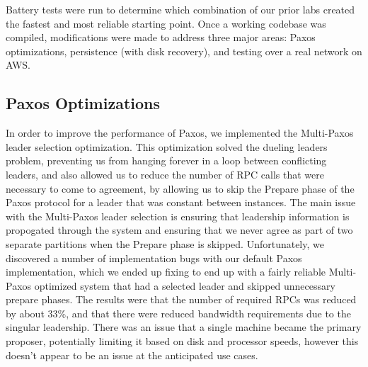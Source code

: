 \documentclass[letterpaper,10pt]{article}
\begin{document}
Battery tests were run to determine which combination of our prior labs created the fastest and most reliable starting point.  Once a working codebase was compiled, modifications were made to address three  major areas: Paxos optimizations, persistence (with disk recovery), and testing over a real network on AWS.

\subsection{Paxos Optimizations}
In order to improve the performance of Paxos, we implemented the Multi-Paxos leader selection optimization. This optimization solved the dueling leaders problem, preventing us from hanging forever in a loop between conflicting leaders, and also allowed us to reduce the number of RPC calls that were necessary to come to agreement, by allowing us to skip the Prepare phase of the Paxos protocol for a leader that was constant between instances. The main issue with the Multi-Paxos leader selection is ensuring that leadership information is propogated through the system and ensuring that we never agree as part of two separate partitions when the Prepare phase is skipped. Unfortunately, we discovered a number of implementation bugs with our default Paxos implementation, which we ended up fixing to end up with a fairly reliable Multi-Paxos optimized system that had a selected leader and skipped unnecessary prepare phases. The results were that the number of required RPCs was reduced by about 33\%, and that there were reduced bandwidth requirements due to the singular leadership. There was an issue that a single machine became the primary proposer, potentially limiting it based on disk and processor speeds, however this doesn't appear to be an issue at the anticipated use cases.
\end{document}
